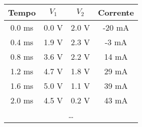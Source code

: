 \begin{tabular}{cccc}
\toprule
        Tempo &           $V_1$ &           $V_2$ &      Corrente \\
\midrule
 0.0 \si{\ms} &  0.0 \si{\volt} &  2.0 \si{\volt} &  -20 \si{\mA} \\
 0.4 \si{\ms} &  1.9 \si{\volt} &  2.3 \si{\volt} &   -3 \si{\mA} \\
 0.8 \si{\ms} &  3.6 \si{\volt} &  2.2 \si{\volt} &   14 \si{\mA} \\
 1.2 \si{\ms} &  4.7 \si{\volt} &  1.8 \si{\volt} &   29 \si{\mA} \\
 1.6 \si{\ms} &  5.0 \si{\volt} &  1.1 \si{\volt} &   39 \si{\mA} \\
 2.0 \si{\ms} &  4.5 \si{\volt} &  0.2 \si{\volt} &   43 \si{\mA} \\
\multicolumn{4}{c}{\dots} \\
\bottomrule
\end{tabular}
